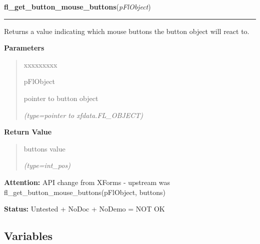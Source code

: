 \hspace{.8\funcindent}\begin{boxedminipage}{\funcwidth}

    \raggedright \textbf{fl\_get\_button\_mouse\_buttons}(\textit{pFlObject})

    \vspace{-1.5ex}

    \rule{\textwidth}{0.5\fboxrule}
\setlength{\parskip}{2ex}
    Returns a value indicating which mouse buttons the button object will 
    react to.

\setlength{\parskip}{1ex}
      \textbf{Parameters}
      \vspace{-1ex}

      \begin{quote}
        \begin{Ventry}{xxxxxxxxx}

          \item[pFlObject]

          pointer to button object

            {\it (type=pointer to xfdata.FL\_OBJECT)}

        \end{Ventry}

      \end{quote}

      \textbf{Return Value}
    \vspace{-1ex}

      \begin{quote}
      buttons value

      {\it (type=int\_pos)}

      \end{quote}

\textbf{Attention:} API change from XForms - upstream was 
fl\_get\_button\_mouse\_buttons(pFlObject, buttons)



\textbf{Status:} Untested + NoDoc + NoDemo = NOT OK



    \end{boxedminipage}



  \subsection{Variables}

